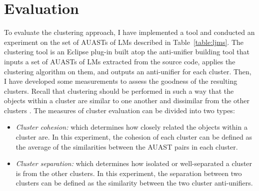 \section{Evaluation} \label{clustering-evaluation}
To evaluate the clustering approach, I have implemented a tool and conducted an experiment on the set of AUASTs of LMs described in Table~\ref{table:ljms}. The clustering tool is an Eclipse plug-in built atop the anti-unifier building tool that inputs a set of AUASTs of LMs extracted from the source code, applies the clustering algorithm on them, and outputs an anti-unifier for each cluster. Then, I have developed some measurements to assess the goodness of the resulting clusters. Recall that clustering should be performed in such a way that the objects within a cluster are similar to one another and dissimilar from the other clusters \cite{tan2005data}. The measures of cluster evaluation can be divided into two types:

\begin{itemize} [leftmargin=0.4in]
\item \emph{Cluster cohesion:} which determines how closely related the objects within a cluster are. In this experiment, the cohesion of each cluster can be defined as the average of the similarities between the AUAST pairs in each cluster.
\item \emph{Cluster separation:} which determines how isolated or well-separated a cluster is from the other clusters. In this experiment, the separation between two clusters can be defined as the similarity between the two cluster anti-unifiers.
\end{itemize}

